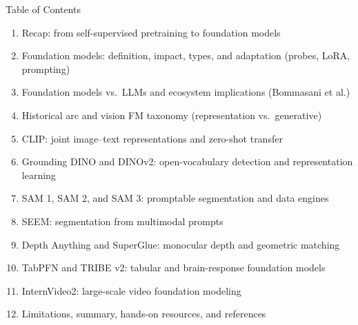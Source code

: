 \begin{frame}{Table of Contents}
  \small
  \begin{enumerate}\itemsep0.12em
    \item Recap: from self-supervised pretraining to foundation models
    \item Foundation models: definition, impact, types, and adaptation (probes, LoRA, prompting)
    \item Foundation models vs.\ LLMs and ecosystem implications (Bommasani et al.)
    \item Historical arc and vision FM taxonomy (representation vs.\ generative)
    \item CLIP: joint image--text representations and zero-shot transfer
    \item Grounding DINO and DINOv2: open-vocabulary detection and representation learning
    \item SAM 1, SAM 2, and SAM 3: promptable segmentation and data engines
    \item SEEM: segmentation from multimodal prompts
    \item Depth Anything and SuperGlue: monocular depth and geometric matching
    \item TabPFN and TRIBE v2: tabular and brain-response foundation models
    \item InternVideo2: large-scale video foundation modeling
    \item Limitations, summary, hands-on resources, and references
  \end{enumerate}
\end{frame}
